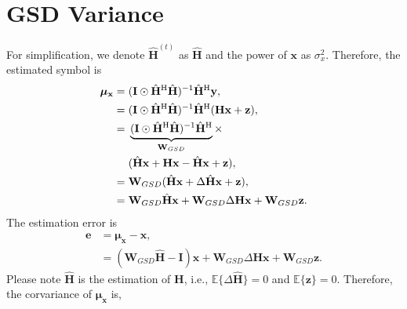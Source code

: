 \documentclass[journal]{IEEEtran}
\newcommand{\HT}{^{\mathrm{H}}} %
\begin{document}
\section{GSD Variance} \label{app:GSD}
For simplification, we denote $\hat{\mathbf H}^{(t)}$ as $ \hat{\mathbf H}$ and the power of $\mathbf x$ as $\sigma_x^2$. Therefore, the estimated symbol is
\begin{equation}
\begin{split}
{\bm \mu}_{\mathbf x} = \hspace{0.3em}& (\mathbf I\odot\hat{\mathbf H}\HT \hat{\mathbf H})^{-1}\hat{\mathbf H}\HT\mathbf y, \\
= \hspace{0.3em}& (\mathbf I\odot\hat{\mathbf H}\HT \hat{\mathbf H})^{-1}\hat{\mathbf H}\HT(\mathbf H \mathbf x + \mathbf z), \\
= \hspace{0.3em}& \underbrace{(\mathbf I\odot\hat{\mathbf H}\HT \hat{\mathbf H})^{-1}\hat{\mathbf H}\HT}_{{\mathbf W}_{GSD}} \times \\
& (\hat{\mathbf H} \mathbf x + \mathbf H \mathbf x - \hat{\mathbf H} \mathbf x + \mathbf z), \\
= \hspace{0.3em} & {\mathbf W}_{GSD} (\hat{\mathbf H} \mathbf x + \Delta\hat{\mathbf H} \mathbf x + \mathbf z), \\
= \hspace{0.3em} & {\mathbf W}_{GSD}\hat{\mathbf H} \mathbf x + {\mathbf W}_{GSD}\Delta \mathbf H\mathbf x +  {\mathbf W}_{GSD}\mathbf z.
\end{split}
\end{equation}
The estimation error is
\begin{equation}
\begin{split}
\mathbf e &= {\bm\mu}_{\mathbf x} - \mathbf x, \\
&= ({\mathbf W}_{GSD}\hat{\mathbf H} - \mathbf I) \mathbf x + {\mathbf W}_{GSD}\Delta \mathbf H\mathbf x + {\mathbf W}_{GSD}\mathbf z.
\end{split}
\end{equation}
Please note $\hat{\mathbf H}$ is the estimation of $\mathbf H$, i.e., $\mathbb{E}\{\Delta\hat{\mathbf H} \}=0$ and $\mathbb{E}\{ \mathbf z\}=0$. Therefore, the corvariance of $\bm\mu_{\mathbf x}$ is,
\end{document}
